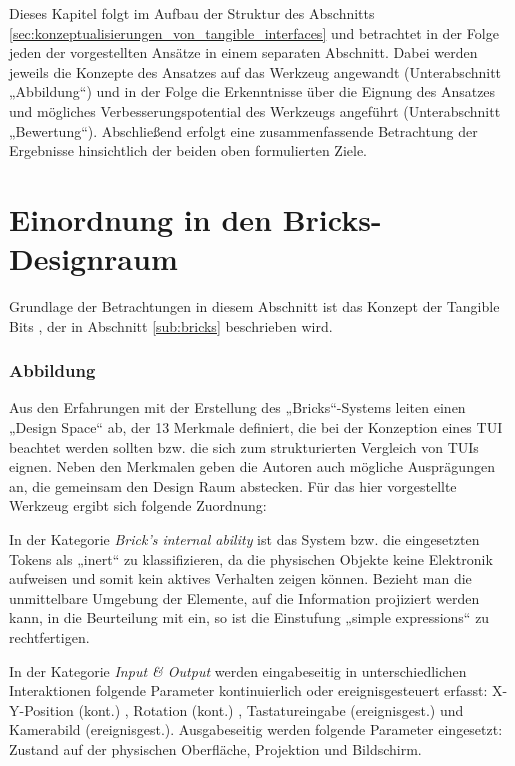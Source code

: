 Dieses Kapitel folgt im Aufbau der Struktur des Abschnitts \ref{sec:konzeptualisierungen_von_tangible_interfaces} und betrachtet in der Folge jeden der vorgestellten Ansätze in einem separaten Abschnitt. Dabei werden jeweils die Konzepte des Ansatzes auf das Werkzeug angewandt (Unterabschnitt „Abbildung“) und in der Folge die Erkenntnisse über die Eignung des Ansatzes und mögliches Verbesserungspotential des Werkzeugs angeführt (Unterabschnitt „Bewertung“). Abschließend erfolgt eine zusammenfassende Betrachtung der Ergebnisse hinsichtlich der beiden oben formulierten Ziele.

\section{Einordnung in den Bricks-Designraum} %
\label{sec:einordnung_in_den_bricks_designraum}

Grundlage der Betrachtungen in diesem Abschnitt ist das Konzept der Tangible Bits \citep{Fitzmaurice95}, der in Abschnitt \ref{sub:bricks} beschrieben wird.

\subsubsection{Abbildung} 

Aus den Erfahrungen mit der Erstellung des „Bricks“-Systems leiten \citet{Fitzmaurice95} einen  „Design Space“ ab, der 13 Merkmale definiert, die bei der Konzeption eines \gls{TUI} beachtet werden sollten bzw. die sich zum strukturierten Vergleich von \glspl{TUI} eignen. Neben den Merkmalen geben die Autoren auch mögliche Ausprägungen an, die gemeinsam den Design Raum abstecken. Für das hier vorgestellte Werkzeug ergibt sich folgende Zuordnung:

In der Kategorie \emph{Brick's internal ability} ist das System bzw. die eingesetzten Tokens als „inert“ zu klassifizieren, da die physischen Objekte keine Elektronik aufweisen und somit kein aktives Verhalten zeigen können. Bezieht man die unmittelbare Umgebung der Elemente, auf die Information projiziert werden kann, in die Beurteilung mit ein, so ist die Einstufung „simple expressions“ zu rechtfertigen. 

In der Kategorie \emph{Input \& Output} werden eingabeseitig in unterschiedlichen Interaktionen folgende Parameter kontinuierlich oder ereignisgesteuert erfasst: X-Y-Position (kont.) , Rotation (kont.) , Tastatureingabe (ereignisgest.) und Kamerabild (ereignisgest.). Ausgabeseitig werden folgende Parameter eingesetzt: Zustand auf der physischen Oberfläche, Projektion und Bildschirm.

